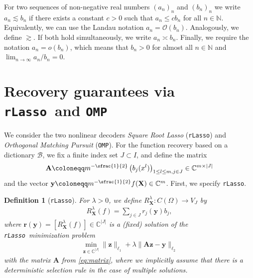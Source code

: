 \documentclass[11pt,reqno, a4paper]{article}
\numberwithin{equation}{section}
\newtheorem{definition}[theorem]{Definition}
\newcommand{\rlasso}{\texttt{rLasso}}
\newcommand{\omp}{\texttt{OMP}}
\begin{document}
For two sequences of non-negative real numbers $(a_n)_n$ and $(b_n)_n$ we write 
$a_n \lesssim b_n$ if there exists a constant $c>0$ such that 
$a_n \leq cb_n$ for all $n\in \mathbb{N}$.
Equivalently, we can use the Landau notation $a_n = \mathcal{O}(b_n)$.
Analogously, we define $\gtrsim$.
If both hold simultaneously, we write $a_n \asymp b_n$.
Finally, we require the notation $a_n = o(b_n)$, which means that $b_n>0$ for almost all $n\in \mathbb{N}$ and $\lim_{n\to \infty} a_n/b_n = 0$. 
\section{Recovery guarantees via \rlasso \ and \omp}\label{sec:RecoveryMethods}

We consider the two nonlinear decoders \emph{Square Root Lasso} (\rlasso) and \emph{Orthogonal Matching Pursuit} (\omp).
For the function recovery based on a dictionary $\mathcal{B}$, we fix a finite index set $J\subset I$, and define the matrix
\begin{gather}\label{eq:matrix}
	\mathbf{A} \coloneqq m^{-\sfrac{1}{2}}\left(b_j(x^l)\right)_{1 \leq l \leq m, j \in J} \in \mathbb{C}^{m\times \lvert J\rvert}
\end{gather}
and the vector $\mathbf{y} \coloneqq m^{-\sfrac{1}{2}} f(\mathbf{X}) \in \mathbb{C}^m$.
First, we specify \rlasso.

\begin{definition}[\rlasso]\label{def:square_root_lasso}
For $\lambda>0$, we define $R_{\mathbf{X}}^\lambda\colon C(\Omega) \to V_J$ by
\begin{gather}\label{eq:Lasso_Decoder}
	R_{\mathbf{X}}^\lambda(f) = \sum_{j \in J} r_j(\mathbf{y}) b_j,
\end{gather}
where $\mathbf{r}(\mathbf{y}) = [R_{\mathbf{X}}^\lambda(f)] \in \mathbb{C}^{\lvert J\rvert}$ is a (fixed) solution of the \rlasso \ minimization problem
\begin{gather}\label{eq:MinimizationProblem}
	\min_{\mathbf{z} \in \mathbb{C}^{\lvert J\rvert}} \lVert\mathbf{z}\rVert_{\ell_1} + \lambda \lVert\mathbf{A} \mathbf{z} - \mathbf{y}\rVert_{\ell_2}
\end{gather}
with the matrix $\mathbf{A}$ from \eqref{eq:matrix}, where we implicitly assume that there is a deterministic selection rule in the case of multiple solutions.
\end{definition}
\end{document}
